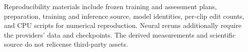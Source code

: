 Reproducibility materials include frozen training and assessment plans,
preparation, training and inference source, model identities, per-clip edit
counts, and CPU scripts for numerical reproduction. Neural reruns additionally
require the providers' data and checkpoints. The derived measurements and
scientific source do not relicense third-party assets.
